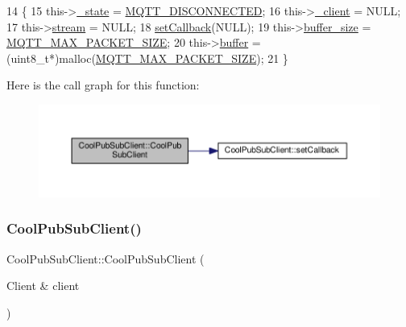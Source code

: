 \begin{DoxyCode}
14                                    \{
15     this->\hyperlink{class_cool_pub_sub_client_aa1953b601206252a30efa5b114eb3e1a}{\_state} = \hyperlink{_cool_pub_sub_client_8h_adaf86a906a305dd129164982d50111b3}{MQTT\_DISCONNECTED};
16     this->\hyperlink{class_cool_pub_sub_client_a487a65bafb6e3b8e9ab544b13a8878a0}{\_client} = NULL;
17     this->\hyperlink{class_cool_pub_sub_client_a7a92417b317e7bd9502ed37752111705}{stream} = NULL;
18     \hyperlink{class_cool_pub_sub_client_ac5cab7658f1bdded32131241e468e661}{setCallback}(NULL);
19     this->\hyperlink{class_cool_pub_sub_client_ae6cb10e42c057483d53516ac830ab526}{buffer\_size} = \hyperlink{_cool_pub_sub_client_8h_ae09b594688a59f1427c7e45259e039b9}{MQTT\_MAX\_PACKET\_SIZE};
20     this->\hyperlink{class_cool_pub_sub_client_a7e8bcc6096626916046a51bebadc7851}{buffer} = (uint8\_t*)malloc(\hyperlink{_cool_pub_sub_client_8h_ae09b594688a59f1427c7e45259e039b9}{MQTT\_MAX\_PACKET\_SIZE});
21 \}
\end{DoxyCode}
Here is the call graph for this function\+:\nopagebreak
\begin{figure}[H]
\begin{center}
\leavevmode
\includegraphics[width=350pt]{d8/d4b/class_cool_pub_sub_client_a2e54e36217bb0969b91b5dee9a27410f_cgraph}
\end{center}
\end{figure}
\mbox{\label{class_cool_pub_sub_client_a0563a12cb4e9339bf2605cfc655e717d}} 
\subsubsection{\texorpdfstring{Cool\+Pub\+Sub\+Client()}{CoolPubSubClient()}\hspace{0.1cm}{\footnotesize\ttfamily [2/14]}}
{\footnotesize\ttfamily Cool\+Pub\+Sub\+Client\+::\+Cool\+Pub\+Sub\+Client (\begin{DoxyParamCaption}\item[{Client \&}]{client }\end{DoxyParamCaption})}



